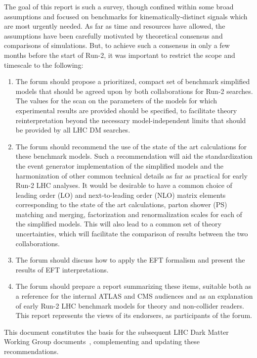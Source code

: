 The goal of this report is such a survey, though confined within some
broad assumptions and focused on benchmarks for kinematically-distinct
signals which are most urgently needed. As far as time and resources
have allowed, the assumptions have been carefully motivated by
theoretical consensus and comparisons of simulations. But, to achieve such a 
consensus in only a few months before the start of Run-2, it was
important to restrict the scope and timescale to the following:

\begin{enumerate}
\item The forum should propose a prioritized, compact set of benchmark
  simplified models that should be agreed upon by both collaborations for
  Run-2 searches. The values for the scan on the parameters of the models for which
  experimental results are provided should be specified, to facilitate theory reinterpretation 
  beyond the necessary model-independent limits that 
  should be provided by all LHC DM searches. 
\item The forum should recommend the use of the state of the art calculations
  for these benchmark models. Such a recommendation will aid the  
  standardization the event generator implementation
  of the simplified models and the harmonization of other common technical
  details as far as practical for early Run-2 LHC analyses. It
  would be desirable to have a common choice of leading order (LO) and 
  next-to-leading order (NLO) matrix elements corresponding to the state of the art calculations, 
  parton shower (PS) matching and merging, factorization and renormalization
  scales for each of the simplified models. This will also lead to a
  common set of theory uncertainties, which will facilitate the
  comparison of results between the two collaborations.
\item The forum should discuss how to apply the
  EFT formalism and present the results of EFT
  interpretations.
\item The forum should prepare a report summarizing these items,
  suitable both as a reference for the internal ATLAS and CMS
  audiences and as an explanation of early Run-2 LHC benchmark models for theory and non-collider
  readers. This report represents the views of its endorsers, as participants of the forum.
\end{enumerate}

This document constitutes the basis for the subsequent LHC Dark Matter Working Group documents~\cite{Boveia:2016mrp, Albert:2017onk, Abe:2018bpo}, complementing and updating these recommendations. 

